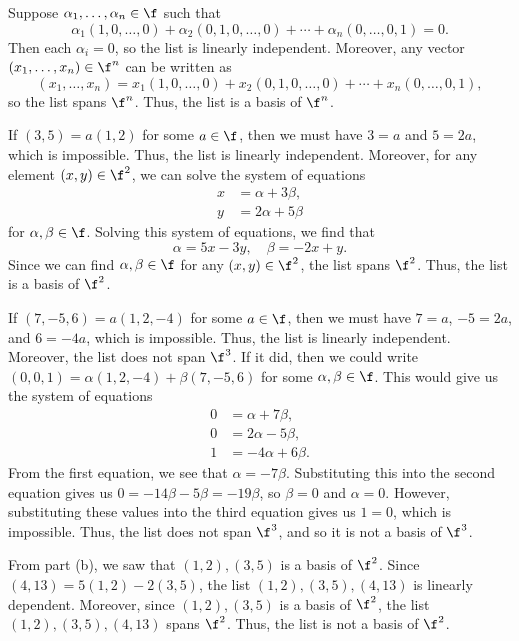\begin{sole}
    \item Suppose $\alpha_1, \ldots, \alpha_n \in \f$ such that
    \[\alpha_1(1, 0, \ldots, 0) + \alpha_2(0, 1, 0, \ldots, 0) + \cdots + \alpha_n(0, \ldots, 0, 1) = 0.\]
    Then each $\alpha_i = 0$, so the list is linearly independent. Moreover, any vector $(x_1, \ldots, x_n) \in \f^n$ can be written as
    \[(x_1, \ldots, x_n) = x_1(1, 0, \ldots, 0) + x_2(0, 1, 0, \ldots, 0) + \cdots + x_n(0, \ldots, 0, 1),\]
    so the list spans $\f^n$. Thus, the list is a basis of $\f^n$.
    \item If $(3, 5) = a(1, 2)$ for some $a \in \f$, then we must have $3 = a$ and $5 = 2a$, which is impossible. Thus, the list is linearly independent. Moreover, for any element $(x, y) \in \f^2$, we can solve the system of equations
    \begin{align*}
        x & = \alpha + 3\beta, \\
        y & = 2\alpha + 5\beta
    \end{align*}
    for $\alpha, \beta \in \f$. Solving this system of equations, we find that
    \[\alpha = 5x - 3y, \quad \beta = -2x + y.\]
    Since we can find $\alpha, \beta \in \f$ for any $(x, y) \in \f^2$, the list spans $\f^2$. Thus, the list is a basis of $\f^2$.
    \item If $(7, -5, 6) = a(1, 2, -4)$ for some $a \in \f$, then we must have $7 = a$, $-5 = 2a$, and $6 = -4a$, which is impossible. Thus, the list is linearly independent. Moreover, the list does not span $\f^3$. If it did, then we could write $(0, 0, 1) = \alpha(1, 2, -4) + \beta(7, -5, 6)$ for some $\alpha, \beta \in \f$. This would give us the system of equations
    \begin{align*}
        0 & = \alpha + 7\beta, \\
        0 & = 2\alpha - 5\beta, \\
        1 & = -4\alpha + 6\beta.
    \end{align*}
    From the first equation, we see that $\alpha = -7\beta$. Substituting this into the second equation gives us $0 = -14\beta - 5\beta = -19\beta$, so $\beta = 0$ and $\alpha = 0$. However, substituting these values into the third equation gives us $1 = 0$, which is impossible. Thus, the list does not span $\f^3$, and so it is not a basis of $\f^3$.
    \item From part (b), we saw that $(1, 2), (3, 5)$ is a basis of $\f^2$. Since $(4, 13) = 5(1, 2) - 2(3, 5)$, the list $(1, 2), (3, 5), (4, 13)$ is linearly dependent. Moreover, since $(1, 2), (3, 5)$ is a basis of $\f^2$, the list $(1, 2), (3, 5), (4, 13)$ spans $\f^2$. Thus, the list is not a basis of $\f^2$.

\end{sole}
